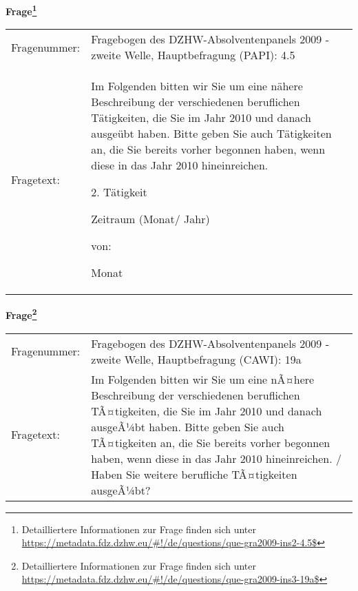 				\vspace*{0.5cm}
                \noindent\textbf{Frage\footnote{Detailliertere Informationen zur Frage finden sich unter
		              \url{https://metadata.fdz.dzhw.eu/\#!/de/questions/que-gra2009-ins2-4.5$}}}\\
				\begin{tabularx}{\hsize}{@{}lX}
					Fragenummer: &
					  Fragebogen des DZHW-Absolventenpanels 2009 - zweite Welle, Hauptbefragung (PAPI):
					  4.5
 \\
					Fragetext: & Im Folgenden bitten wir Sie um eine nähere Beschreibung der verschiedenen beruflichen Tätigkeiten, die Sie im Jahr 2010 und danach ausgeübt haben. Bitte geben Sie auch Tätigkeiten an, die Sie bereits vorher begonnen haben, wenn diese in das Jahr 2010 hineinreichen.\par  2. Tätigkeit\par  Zeitraum (Monat/ Jahr)\par  von:\par  Monat \\
				\end{tabularx}
				\vspace*{0.5cm}
                \noindent\textbf{Frage\footnote{Detailliertere Informationen zur Frage finden sich unter
		              \url{https://metadata.fdz.dzhw.eu/\#!/de/questions/que-gra2009-ins3-19a$}}}\\
				\begin{tabularx}{\hsize}{@{}lX}
					Fragenummer: &
					  Fragebogen des DZHW-Absolventenpanels 2009 - zweite Welle, Hauptbefragung (CAWI):
					  19a
 \\
					Fragetext: & Im Folgenden bitten wir Sie um eine nÃ¤here Beschreibung der verschiedenen beruflichen TÃ¤tigkeiten, die Sie im Jahr 2010 und danach ausgeÃ¼bt haben. Bitte geben Sie auch TÃ¤tigkeiten an, die Sie bereits vorher begonnen haben, wenn diese in das Jahr 2010 hineinreichen. / Haben Sie weitere berufliche TÃ¤tigkeiten ausgeÃ¼bt? \\
				\end{tabularx}





